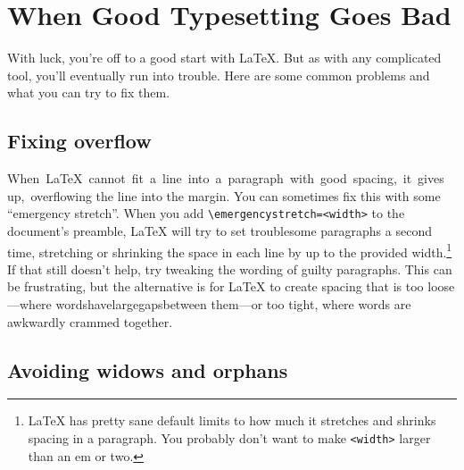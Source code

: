 \chapter{When Good Typesetting Goes Bad}

With luck, you're off to a good start with \LaTeX.
But as with any complicated tool, you'll eventually run into trouble.
Here are some common problems and what you can try to fix them.

\section{Fixing overflow}

\mbox{When \LaTeX{} cannot fit a line into a paragraph with good spacing,
it gives up, overflowing} the line into the margin.
You can sometimes fix this with some ``emergency stretch''\quotekern.
When you add \texttt{\textbackslash emergencystretch=\allowbreak<width>}
to the document's preamble,
\LaTeX{} will try to set troublesome paragraphs a second time,
stretching or shrinking the space in each line by up to the provided
width.\punckern\footnote{\LaTeX{} has pretty sane default limits to how much
it stretches and shrinks spacing in a paragraph.
You probably don't want to make \texttt{<width>} larger than an em or two.}
If that still doesn't help, try tweaking the wording of guilty paragraphs.
This can be frustrating, but the alternative is for \LaTeX{} to create spacing
that is too loose---where\quad
words\quad have\quad large\quad gaps\quad between\quad
them---or too tight, where\! words\! are\! awkwardly\! crammed\! together.

\section{Avoiding widows and orphans}

